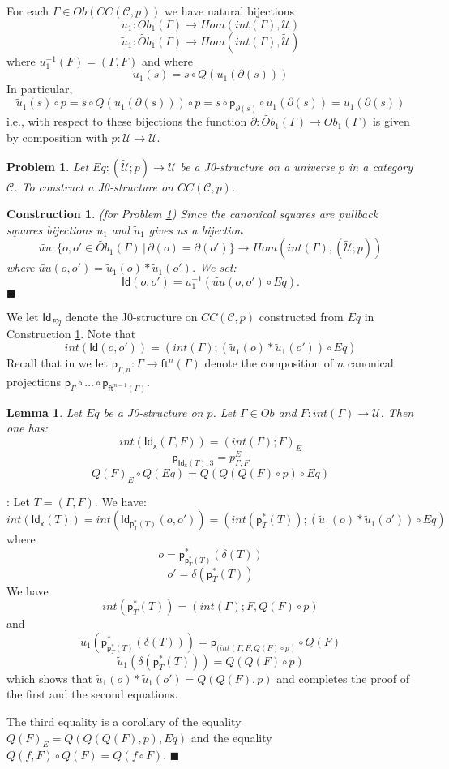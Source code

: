 \documentclass[12pt]{article}
\numberwithin{equation}{section}
\newenvironment{eq}{\begin{equation}}{\end{equation}}
\newenvironment{myproof}{{\bf Proof}:}{$\blacksquare$ \vskip 5mm }
\newtheorem{lemma}[proposition]{Lemma}
\newtheorem{problem}[proposition]{Problem}
\newtheorem{construction0}[proposition]{Construction}
\newenvironment{construction}[1]{\begin{construction0}(for Problem \ref{#1})}{$\blacksquare$ \end{construction0}}
\newcommand{\llabel}[1]{\label{#1}}
\newcommand{\sr}{\rightarrow}
\newcommand{\wt}{\widetilde}
\newcommand{\toCC}{CC} %
\newcommand{\ft}{\mathsf{ft}}
\newcommand{\p}{\mathsf{p}}
\newcommand{\Id}{\mathsf{Id}} %
\newcommand{\Idx}{\mathsf{Id_x}} %
\newcommand{\U}{\mathcal{U}}
\begin{document}
For each $\Gamma\in Ob(\toCC({\mathcal C},p))$ we have natural bijections
%
\begin{eq}
\llabel{2015.03.27.eq7b} u_1:Ob_1(\Gamma)\sr Hom(int(\Gamma),\U)
\end{eq}
%
\begin{eq}
\llabel{2015.03.27.eq7a} \wt{u}_1:\wt{Ob}_1(\Gamma)\sr Hom(int(\Gamma),\wt{\U})
\end{eq}
%
where $u_1^{-1}(F)=(\Gamma,F)$ and where
%
\begin{eq}
\llabel{2015.03.31.eq5} \wt{u}_1(s)=s\circ Q(u_1(\partial(s)))
\end{eq}
%
In particular,
%
$$\wt{u}_1(s)\circ p=s\circ Q(u_1(\partial(s)))\circ p=s\circ
\p_{\partial(s)}\circ u_1(\partial(s))=u_1(\partial(s))$$
%
i.e., with respect to these bijections the function
$\partial:\wt{Ob}_1(\Gamma)\sr Ob_1(\Gamma)$ is given by composition with
$p:\wt{\U}\sr \U$.
%
\begin{problem}
\llabel{2015.03.27.prob3} Let $Eq:(\wt{\U};p)\sr \U$ be a J0-structure on a
universe $p$ in a category $\mathcal C$. To construct a J0-structure on
$\toCC({\mathcal C},p)$.
\end{problem}
%
\begin{construction}{2015.03.27.prob3}\rm
\llabel{2015.03.27.constr3} Since the canonical squares are pullback squares
bijections $u_1$ and $\wt{u}_1$ gives us a bijection
%
$$\wt{uu}:\{o,o'\in\wt{Ob}_1(\Gamma)\,|\,\partial(o)=\partial(o')\} \sr
Hom(int(\Gamma),(\wt{\U};p))$$
%
where $\wt{uu}(o,o')=\wt{u}_1(o)*\wt{u}_1(o')$. We set:
%
$$\Id(o,o')=u_1^{-1}(\wt{uu}(o,o')\circ Eq).$$
%
\end{construction}
%
We let $\Id_{Eq}$ denote the J0-structure on $\toCC({\mathcal C},p)$ constructed
from $Eq$ in Construction \ref{2015.03.27.constr3}. Note that
%
\begin{eq}
\llabel{2015.03.31.eq1}
int(\Id(o,o'))=(int(\Gamma);(\wt{u}_1(o)*\wt{u}_1(o'))\circ Eq)
\end{eq}
%
Recall that in \cite{Csubsystems} we let $\p_{\Gamma,n}:\Gamma\sr \ft^n(\Gamma)$
denote the composition of $n$ canonical projections $\p_{\Gamma}\circ \dots\circ
\p_{\ft^{n-1}(\Gamma)}$.
%
\begin{lemma}
\llabel{2015.03.27.l1} Let $Eq$ be a J0-structure on $p$. Let $\Gamma\in Ob$
and $F:int(\Gamma)\sr \U$. Then one has:
%
$$int(\Idx(\Gamma,F))=(int(\Gamma);F)_{E}$$
$$\p_{\Idx(T),3} = p^E_{\Gamma,F}$$
$$Q(F)_{E}\circ Q(Eq)=Q(Q(Q(F)\circ p)\circ Eq)$$
%
%
\end{lemma}
%
\begin{myproof}
Let $T=(\Gamma,F)$. We have:
%
$$int(\Idx(T))=int(\Id_{\p_T^*(T)}(o,o'))=(int(\p_T^*(T));(\wt{u}_1(o)*\wt{u}_1(o'))\circ
Eq)$$
%
where
%
$$o=\p_{\p_T^*(T)}^*(\delta(T))$$
$$o'=\delta(\p_T^*(T))$$
%
We have
%
$$int(\p_T^*(T))=(int(\Gamma);F,Q(F)\circ p)$$
%
and
%
$$\wt{u}_1(\p_{\p_T^*(T)}^*(\delta(T)))=\p_{(int(\Gamma,F, Q(F)\circ p)}\circ
Q(F)$$
$$\wt{u}_1(\delta(\p_T^*(T)))=Q(Q(F)\circ p)$$
%
which shows that $\wt{u}_1(o)*\wt{u}_1(o')=Q(Q(F),p)$ and completes the proof
of the first and the second equations.

The third equality is a corollary of the equality $Q(F)_{E}=Q(Q(Q(F),p),Eq)$
and the equality $Q(f,F)\circ Q(F)=Q(f\circ F)$.
\end{myproof}
\end{document}
